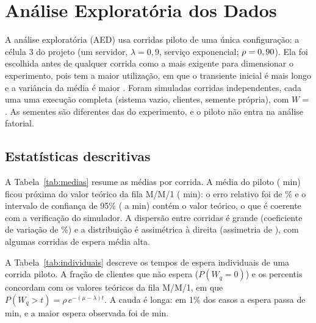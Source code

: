 \documentclass[stu,a4paper,12pt,floatsintext,biblatex]{apa7}
\newcommand{\Wq}{W_q}
\begin{document}
\section{Análise Exploratória dos Dados}
\label{sec:aed}
A análise exploratória (AED) usa corridas piloto de uma única configuração: a célula 3 do projeto (um servidor, $\lambda = 0{,}9$, serviço exponencial; $\rho = 0,90{}$).
Ela foi escolhida antes de qualquer corrida como a mais exigente para dimensionar o experimento, pois tem a maior utilização, em que o transiente inicial é mais longo e a variância da média é maior \parencite{kelton1985,law2000}.
Foram simuladas \RPiloto{} corridas independentes, cada uma uma execução completa (sistema vazio, \NClientes{} clientes, semente própria), com $W = $ \Aquecimento{}.
As sementes são diferentes das do experimento, e o piloto não entra na análise fatorial.

\subsection{Estatísticas descritivas}
A Tabela~\ref{tab:medias} resume as \RPiloto{} médias por corrida.
A média do piloto (\PilotoMedia{} min) ficou próxima do valor teórico da fila M/M/1 (\PilotoTeo{} min): o erro relativo foi de \PilotoErro{}\% e o intervalo de confiança de 95\% (\PilotoIcInf{} a \PilotoIcSup{} min) contém o valor teórico, o que é coerente com a verificação do simulador.
A dispersão entre corridas é grande (coeficiente de variação de \PilotoCv{}\%) e a distribuição é assimétrica à direita (assimetria de \PilotoAssim{}), com algumas corridas de espera média alta.

\begin{table}[H]
\caption{Estatísticas descritivas da espera média por corrida nas corridas piloto}
\label{tab:medias}

\end{table}

A Tabela~\ref{tab:individuais} descreve os tempos de espera individuais de uma corrida piloto.
A fração de clientes que não espera ($P(\Wq = 0)$) e os percentis concordam com os valores teóricos da fila M/M/1, em que $P(\Wq > t) = \rho\, e^{-(\mu - \lambda)t}$.
A cauda é longa: em 1\% dos casos a espera passa de \PilotoPnoventa{} min, e a maior espera observada foi de \PilotoMaximo{} min.
\end{document}
